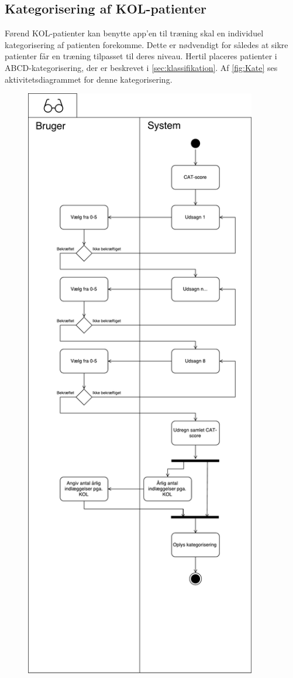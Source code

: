 \subsection{Kategorisering af KOL-patienter} \label{sec:kategorisering}
Førend KOL-patienter kan benytte app'en til træning skal en individuel kategorisering af patienten forekomme. Dette er nødvendigt for således at sikre patienter får en træning tilpasset til deres niveau. 
Hertil placeres patienter i ABCD-kategorisering, der er beskrevet i \autoref{sec:klassifikation}. Af \autoref{fig:Kate} ses aktivitetsdiagrammet for denne kategorisering.

\begin{figure} [H]
\centering
\includegraphics[width=0.9\textwidth]{figures/aktivitetsdiagram/Kategorisering}

\end{figure}
